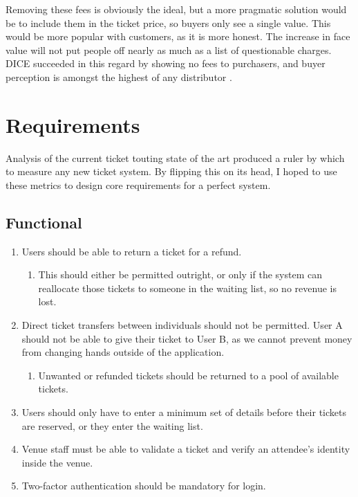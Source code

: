 \documentclass[12pt,a4paper]{bhamdissertation}
\begin{document}
Removing these fees is obviously the ideal, but a more pragmatic solution would be to include them in the ticket price, so buyers only see a single value. This would be more popular with customers, as it is more honest. The increase in face value will not put people off nearly as much as a list of questionable charges. DICE succeeded in this regard by showing no fees to purchasers, and buyer perception is amongst the highest of any distributor \cite{D16}.

\chapter{Requirements} \label{requirements}

Analysis of the current ticket touting state of the art produced a ruler by which to measure any new ticket system. By flipping this on its head, I hoped to use these metrics to design core requirements for a perfect system.

\section{Functional}

\begin{enumerate}
    \item Users should be able to return a ticket for a refund.
    \begin{enumerate}
        \item This should either be permitted outright, or only if the system can reallocate those tickets to someone in the waiting list, so no revenue is lost.
    \end{enumerate}
    \item Direct ticket transfers between individuals should not be permitted. User A should not be able to give their ticket to User B, as we cannot prevent money from changing hands outside of the application.
    \begin{enumerate}
        \item Unwanted or refunded tickets should be returned to a pool of available tickets.
    \end{enumerate}
    \item Users should only have to enter a minimum set of details before their tickets are reserved, or they enter the waiting list.
    \item Venue staff must be able to validate a ticket and verify an attendee's identity inside the venue.
    \item Two-factor authentication should be mandatory for login.
\end{enumerate}
\end{document}
